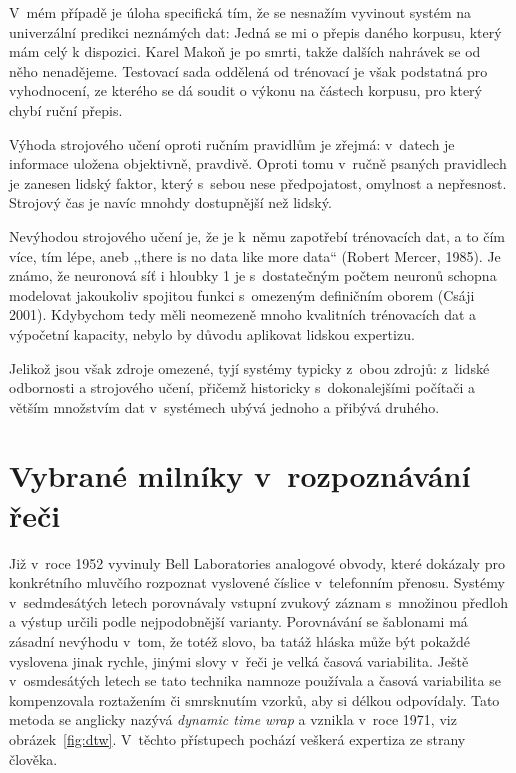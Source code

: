V~mém případě je úloha specifická tím, že se nesnažím vyvinout systém na
univerzální predikci neznámých dat: Jedná se mi o přepis daného korpusu, který
mám celý k dispozici. Karel Makoň je po smrti, takže dalších nahrávek se od něho
nenadějeme. Testovací sada oddělená od trénovací je však podstatná pro
vyhodnocení, ze kterého se dá soudit o výkonu na částech korpusu, pro který
chybí ruční přepis.

Výhoda strojového učení oproti ručním pravidlům je zřejmá: v~datech je informace
uložena objektivně, pravdivě. Oproti tomu v~ručně psaných pravidlech je zanesen
lidský faktor, který s~sebou nese předpojatost, omylnost a nepřesnost. Strojový
čas je navíc mnohdy dostupnější než lidský.

Nevýhodou strojového učení je, že je k~němu zapotřebí trénovacích dat, a to čím
více, tím lépe, aneb ,,there is no data like more data`` (Robert Mercer, 1985). Je
známo, že neuronová síť i hloubky 1 je s~dostatečným počtem neuronů schopna
modelovat jakoukoliv spojitou funkci s~omezeným definičním oborem (Csáji
2001)\cite{csaji2001approximation}. Kdybychom tedy měli neomezeně mnoho
kvalitních trénovacích dat a výpočetní kapacity, nebylo by důvodu aplikovat
lidskou expertizu.

Jelikož jsou však zdroje omezené, tyjí systémy typicky z~obou zdrojů: z~lidské
odbornosti a strojového učení, přičemž historicky s~dokonalejšími počítači a
větším množstvím dat v~systémech ubývá jednoho a přibývá druhého.

\section{Vybrané milníky v~rozpoznávání řeči}

Již v~roce 1952 vyvinuly Bell Laboratories analogové obvody, které dokázaly pro
konkrétního mluvčího rozpoznat vyslovené číslice v~telefonním
přenosu.\cite{davis1952automatic}
Systémy v~sedmdesátých letech porovnávaly vstupní zvukový záznam
s~množinou předloh a výstup určili podle nejpodobnější
varianty\cite{huang2014historical}.
Porovnávání se šablonami má zásadní nevýhodu v~tom, že totéž slovo, ba tatáž
hláska může být pokaždé vyslovena jinak rychle, jinými slovy v~řeči je velká
časová variabilita. Ještě v~osmdesátých letech se tato technika namnoze
používala a časová variabilita se kompenzovala roztažením či smrsknutím vzorků,
aby si délkou odpovídaly. Tato metoda se anglicky nazývá \textit{dynamic time
wrap} a vznikla v~roce 1971\cite{sakoe1971chiba}, viz obrázek~\ref{fig:dtw}.
V~těchto přístupech pochází veškerá expertiza ze strany člověka.

